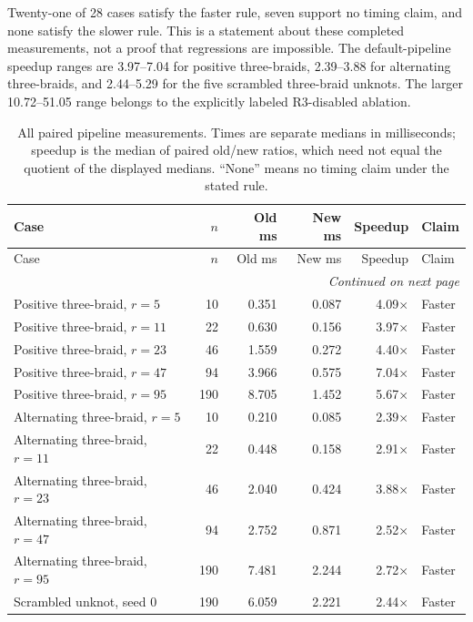 \documentclass[11pt,letterpaper]{article}
\theoremstyle{definition}
\begin{document}
Twenty-one of 28 cases satisfy the faster rule, seven support no timing
claim, and none satisfy the slower rule. This is a statement about these
completed measurements, not a proof that regressions are impossible.
The default-pipeline speedup ranges are 3.97--7.04 for positive
three-braids, 2.39--3.88 for alternating three-braids, and 2.44--5.29
for the five scrambled three-braid unknots. The larger 10.72--51.05
range belongs to the explicitly labeled R3-disabled ablation.

\begingroup
\small
\setlength{\tabcolsep}{4pt}
\begin{longtable}{@{}p{}rrrrl@{}}
\caption{All paired pipeline measurements. Times are separate medians in
milliseconds; speedup is the median of paired old/new ratios, which need
not equal the quotient of the displayed medians. ``None'' means no timing
claim under the stated rule.}\label{tab:paired}\\
\toprule
Case & \(n\) & Old ms & New ms & Speedup & Claim\\
\midrule
\endfirsthead
\toprule
Case & \(n\) & Old ms & New ms & Speedup & Claim\\
\midrule
\endhead
\midrule
\multicolumn{6}{r}{\emph{Continued on next page}}\\
\endfoot
\bottomrule
\endlastfoot
Positive three-braid, \(r=5\) & 10 & 0.351 & 0.087 & 4.09\(\times\) & Faster \\
Positive three-braid, \(r=11\) & 22 & 0.630 & 0.156 & 3.97\(\times\) & Faster \\
Positive three-braid, \(r=23\) & 46 & 1.559 & 0.272 & 4.40\(\times\) & Faster \\
Positive three-braid, \(r=47\) & 94 & 3.966 & 0.575 & 7.04\(\times\) & Faster \\
Positive three-braid, \(r=95\) & 190 & 8.705 & 1.452 & 5.67\(\times\) & Faster \\
Alternating three-braid, \(r=5\) & 10 & 0.210 & 0.085 & 2.39\(\times\) & Faster \\
Alternating three-braid, \(r=11\) & 22 & 0.448 & 0.158 & 2.91\(\times\) & Faster \\
Alternating three-braid, \(r=23\) & 46 & 2.040 & 0.424 & 3.88\(\times\) & Faster \\
Alternating three-braid, \(r=47\) & 94 & 2.752 & 0.871 & 2.52\(\times\) & Faster \\
Alternating three-braid, \(r=95\) & 190 & 7.481 & 2.244 & 2.72\(\times\) & Faster \\
Scrambled unknot, seed 0 & 190 & 6.059 & 2.221 & 2.44\(\times\) & Faster \\

\end{longtable}
\end{document}
